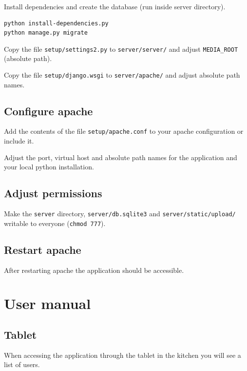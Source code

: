 Install dependencies and create the database (run inside server
directory).

\begin{verbatim}
python install-dependencies.py
python manage.py migrate
\end{verbatim}

Copy the file \texttt{setup/settings2.py} to \texttt{server/server/} and
adjust \texttt{MEDIA\_ROOT} (absolute path).

Copy the file \texttt{setup/django.wsgi} to \texttt{server/apache/} and
adjust absolute path names.

\subsection{Configure apache}\label{configure-apache}

Add the contents of the file \texttt{setup/apache.conf} to your apache
configuration or include it.

Adjust the port, virtual host and absolute path names for the
application and your local python installation.

\subsection{Adjust permissions}\label{adjust-permissions}

Make the \texttt{server} directory, \texttt{server/db.sqlite3} and
\texttt{server/static/upload/} writable to everyone
(\texttt{chmod\ 777}).

\subsection{Restart apache}\label{restart-apache}

After restarting apache the application should be accessible.

\newpage
\section{User manual}\label{user-manual}

\subsection{Tablet}\label{tablet}

When accessing the application through the tablet in the kitchen you
will see a list of users.

